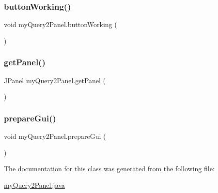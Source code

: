 \subsubsection{\texorpdfstring{button\+Working()}{buttonWorking()}}
{\footnotesize\ttfamily void my\+Query2\+Panel.\+button\+Working (\begin{DoxyParamCaption}{ }\end{DoxyParamCaption})}

\hypertarget{classmy_query2_panel_a7977bb42f9d5959684f805e08337d27b}{}\label{classmy_query2_panel_a7977bb42f9d5959684f805e08337d27b} 
\subsubsection{\texorpdfstring{get\+Panel()}{getPanel()}}
{\footnotesize\ttfamily J\+Panel my\+Query2\+Panel.\+get\+Panel (\begin{DoxyParamCaption}{ }\end{DoxyParamCaption})}

\hypertarget{classmy_query2_panel_a734aedb77732969bf2c9834104a0d59e}{}\label{classmy_query2_panel_a734aedb77732969bf2c9834104a0d59e} 
\subsubsection{\texorpdfstring{prepare\+Gui()}{prepareGui()}}
{\footnotesize\ttfamily void my\+Query2\+Panel.\+prepare\+Gui (\begin{DoxyParamCaption}{ }\end{DoxyParamCaption})}



The documentation for this class was generated from the following file\+:\begin{DoxyCompactItemize}
\item 
\hyperlink{my_query2_panel_8java}{my\+Query2\+Panel.\+java}\end{DoxyCompactItemize}
